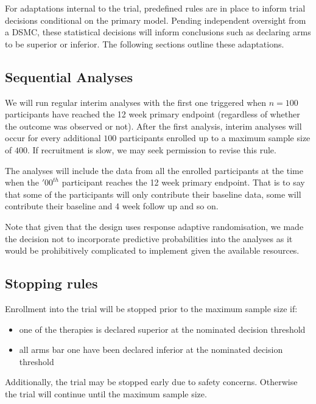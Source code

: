 \documentclass[
]{article}
\begin{document}
For adaptations internal to the trial, predefined rules are in place to inform trial decisions conditional on the primary model.
Pending independent oversight from a DSMC, these statistical decisions will inform conclusions such as declaring arms to be superior or inferior.
The following sections outline these adaptations.

\hypertarget{sequential-analyses}{%
  \subsection{Sequential Analyses}\label{sequential-analyses}}

We will run regular interim analyses with the first one triggered when \(n=100\) participants have reached the 12 week primary endpoint (regardless of whether the outcome was observed or not).
After the first analysis, interim analyses will occur for every additional \(100\) participants enrolled up to a maximum sample size of \(400\).
If recruitment is slow, we may seek permission to revise this rule.

The analyses will include the data from all the enrolled participants at the time when the $'00^{th}$ participant reaches the 12 week primary endpoint.
That is to say that some of the participants will only contribute their baseline data, some will contribute their baseline and 4 week follow up and so on.

Note that given that the design uses response adaptive randomisation, we made the decision not to incorporate predictive probabilities into the analyses as it would be prohibitively complicated to implement given the available resources.

\hypertarget{stopping-rules}{%
  \subsection{Stopping rules}\label{stopping-rules}}

Enrollment into the trial will be stopped prior to the maximum sample size if:

\begin{itemize}
  \item one of the therapies is declared superior at the nominated decision threshold
  \item all arms bar one have been declared inferior at the nominated decision threshold
\end{itemize}

Additionally, the trial may be stopped early due to safety concerns.
Otherwise the trial will continue until the maximum sample size.
\end{document}
